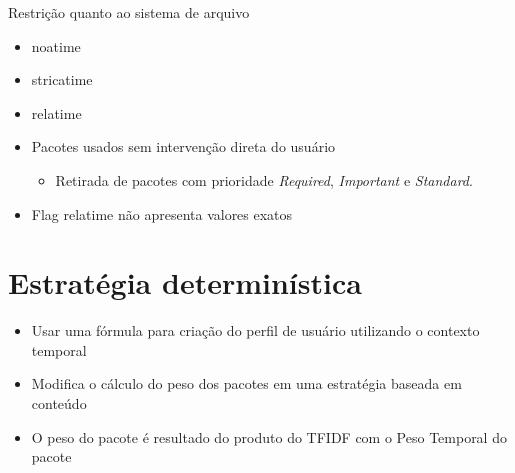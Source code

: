 \begin{frame}
    Restrição quanto ao sistema de arquivo

    \begin{itemize}
        \item noatime
        \item stricatime
        \item relatime
    \end{itemize}
\end{frame}

\begin{frame}

    \begin{itemize}
        \item Pacotes usados sem intervenção direta do usuário
            \begin{itemize}
                \item Retirada de pacotes com prioridade \textit{Required},
                      \textit{Important} e \textit{Standard}.
            \end{itemize}
        \item Flag relatime não apresenta valores exatos
    \end{itemize}

\end{frame}

\section{Estratégia determinística} %
\label{sec:estrategia_deterministica}

\begin{frame}
\begin{itemize}
    \item Usar uma fórmula para criação do perfil de usuário utilizando
    o contexto temporal
\end{itemize}
\end{frame}

\begin{frame}
\begin{itemize}
    \item Modifica o cálculo do peso dos pacotes em uma estratégia
    baseada em conteúdo
    \item O peso do pacote é resultado do produto do TFIDF com o
    Peso Temporal do pacote
\end{itemize}
\end{frame}

